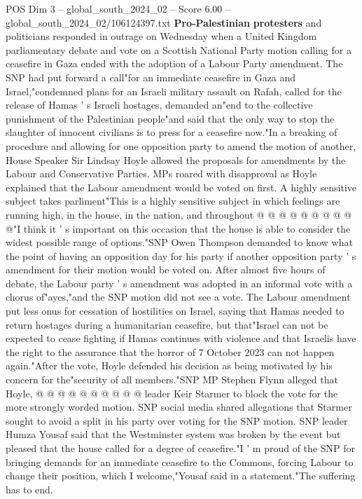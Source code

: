 \begin{textsample}{POS Dim 3 – global\_south\_2024\_02 – Score 6.00 – global\_south\_2024\_02/106124397.txt}  \label{ex:f3_pos_376}
\textbf{Pro-Palestinian} \textbf{protesters} and politicians responded in outrage on Wednesday when a United Kingdom parliamentary debate and vote on a Scottish National Party motion calling for a ceasefire in Gaza ended with the adoption of a Labour Party amendment.
The SNP had put forward a call"for an immediate ceasefire in Gaza and Israel,"condemned plans for an Israeli military assault on Rafah, called for the release of Hamas ' s Israeli hostages, demanded an"end to the collective punishment of the Palestinian people"and said that the only way to stop the slaughter of innocent civilians is to press for a ceasefire now."In a breaking of procedure and allowing for one opposition party to amend the motion of another, House Speaker Sir Lindsay Hoyle allowed the proposals for amendments by the Labour and Conservative Parties.
MPs roared with disapproval as Hoyle explained that the Labour amendment would be voted on first.
A highly sensitive subject takes parliment"This is a highly sensitive subject in which feelings are running high, in the house, in the nation, and throughout @ @ @ @ @ @ @ @ @ @"I think it ' s important on this occasion that the house is able to consider the widest possible range of options."SNP Owen Thompson demanded to know what the point of having an opposition day for his party if another opposition party ' s amendment for their motion would be voted on.
After almost five hours of debate, the Labour party ' s amendment was adopted in an informal vote with a chorus of"ayes,"and the SNP motion did not see a vote.
The Labour amendment put less onus for cessation of hostilities on Israel, saying that Hamas needed to return hostages during a humanitarian ceasefire, but that"Israel can not be expected to cease fighting if Hamas continues with violence and that Israelis have the right to the assurance that the horror of 7 October 2023 can not happen again."After the vote, Hoyle defended his decision as being motivated by his concern for the"security of all members."SNP MP Stephen Flynn alleged that Hoyle, @ @ @ @ @ @ @ @ @ @ leader Keir Starmer to block the vote for the more strongly worded motion.
SNP social media shared allegations that Starmer sought to avoid a split in his party over voting for the SNP motion.
SNP leader Humza Yousaf said that the Westminster system was broken by the event but pleased that the house called for a degree of ceasefire."I ' m proud of the SNP for bringing demands for an immediate ceasefire to the Commons, forcing Labour to change their position, which I welcome,"Yousaf said in a statement."The suffering has to end.

\end{textsample}
